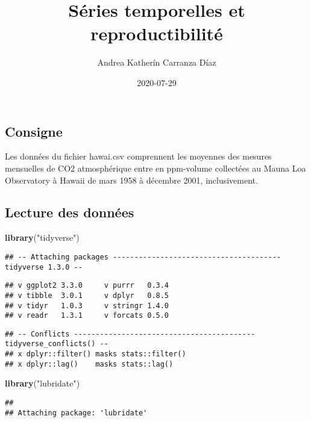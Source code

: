 \documentclass[
]{article}
\title{Séries temporelles et reproductibilité}
\author{Andrea Katherín Carranza Díaz}
\date{2020-07-29}
\newenvironment{Shaded}{\begin{snugshade}}{\end{snugshade}}
\newcommand{\KeywordTok}[1]{\textcolor[rgb]{0.13,0.29,0.53}{\textbf{#1}}}
\newcommand{\NormalTok}[1]{#1}
\newcommand{\StringTok}[1]{\textcolor[rgb]{0.31,0.60,0.02}{#1}}
\begin{document}
\maketitle

\hypertarget{consigne}{%
\subsection{Consigne}\label{consigne}}

Les données du fichier hawai.csv comprennent les moyennes des mesures
mensuelles de CO2 atmosphérique entre en ppm-volume collectées au Mauna
Loa Observatory à Hawaii de mars 1958 à décembre 2001, inclusivement.

\hypertarget{lecture-des-donnuxe9es}{%
\subsection{Lecture des données}\label{lecture-des-donnuxe9es}}

\begin{Shaded}
\begin{Highlighting}[]
\KeywordTok{library}\NormalTok{(}\StringTok{"tidyverse"}\NormalTok{)}
\end{Highlighting}
\end{Shaded}

\begin{verbatim}
## -- Attaching packages --------------------------------------- tidyverse 1.3.0 --
\end{verbatim}

\begin{verbatim}
## v ggplot2 3.3.0     v purrr   0.3.4
## v tibble  3.0.1     v dplyr   0.8.5
## v tidyr   1.0.3     v stringr 1.4.0
## v readr   1.3.1     v forcats 0.5.0
\end{verbatim}

\begin{verbatim}
## -- Conflicts ------------------------------------------ tidyverse_conflicts() --
## x dplyr::filter() masks stats::filter()
## x dplyr::lag()    masks stats::lag()
\end{verbatim}

\begin{Shaded}
\begin{Highlighting}[]
\KeywordTok{library}\NormalTok{(}\StringTok{"lubridate"}\NormalTok{)}
\end{Highlighting}
\end{Shaded}

\begin{verbatim}
## 
## Attaching package: 'lubridate'
\end{verbatim}
\end{document}
